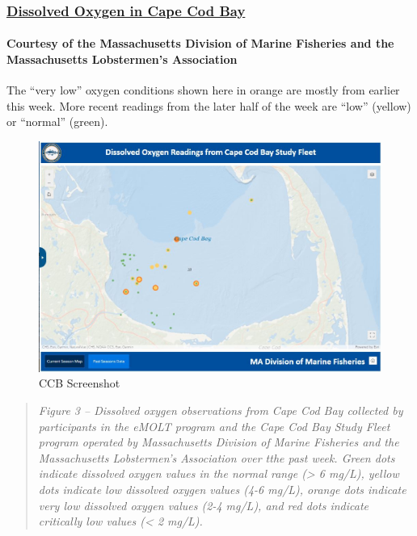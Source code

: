 \documentclass[
]{article}
\begin{document}
\hypertarget{dissolved-oxygen-in-cape-cod-bay}{%
\subsubsection{\texorpdfstring{\href{https://experience.arcgis.com/experience/0d553dfc6c60487cb1f4d20b5366ee0b/page/Map-Page/}{Dissolved
Oxygen in Cape Cod
Bay}}{Dissolved Oxygen in Cape Cod Bay}}\label{dissolved-oxygen-in-cape-cod-bay}}

\hypertarget{courtesy-of-the-massachusetts-division-of-marine-fisheries-and-the-massachusetts-lobstermens-association}{%
\paragraph{Courtesy of the Massachusetts Division of Marine Fisheries
and the Massachusetts Lobstermen's
Association}\label{courtesy-of-the-massachusetts-division-of-marine-fisheries-and-the-massachusetts-lobstermens-association}}

The ``very low'' oxygen conditions shown here in orange are mostly from
earlier this week. More recent readings from the later half of the week
are ``low'' (yellow) or ``normal'' (green).

\begin{figure}
\centering
\includegraphics{CCB_screenshot.JPG}
\caption{CCB Screenshot}
\end{figure}

\begin{quote}
\emph{Figure 3 -- Dissolved oxygen observations from Cape Cod Bay
collected by participants in the eMOLT program and the Cape Cod Bay
Study Fleet program operated by Massachusetts Division of Marine
Fisheries and the Massachusetts Lobstermen's Association over tthe past
week. Green dots indicate dissolved oxygen values in the normal range
(\textgreater{} 6 mg/L), yellow dots indicate low dissolved oxygen
values (4-6 mg/L), orange dots indicate very low dissolved oxygen values
(2-4 mg/L), and red dots indicate critically low values (\textless{} 2
mg/L).}
\end{quote}
\end{document}
